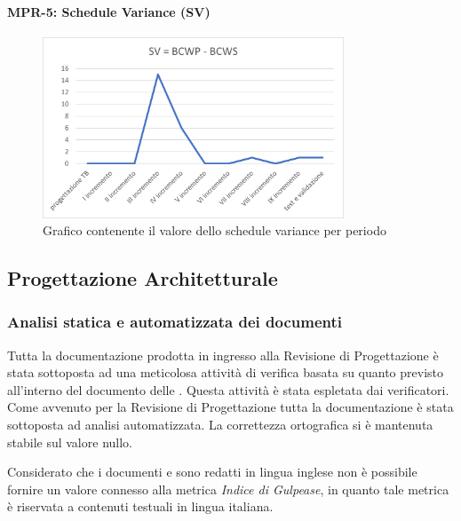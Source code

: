 \paragraph{MPR-5: Schedule Variance (SV)}\label{_SV}
\begin{figure}[!htb]
    \centering
    \includegraphics[width=0.8\textwidth]{res/images/metriche_costi/SV.png}
    \caption{Grafico contenente il valore dello schedule variance per periodo}
\end{figure} 

\newpage
\subsection{Progettazione Architetturale} 

\subsubsection{Analisi statica e automatizzata dei documenti}\label{resocontoProgettazioneArchitetturale}
Tutta la documentazione prodotta in ingresso alla Revisione di Progettazione è stata sottoposta ad una meticolosa attività di verifica
basata su quanto previsto all'interno del documento delle .
Questa attività è stata espletata dai verificatori.
Come avvenuto per la Revisione di Progettazione tutta la documentazione è stata sottoposta ad analisi automatizzata.
La correttezza ortografica si è mantenuta stabile sul valore nullo.

Considerato che i documenti  e   sono redatti in lingua inglese
non è possibile fornire un valore connesso alla metrica \textit{Indice di Gulpease}, in quanto tale metrica è riservata a contenuti 
testuali in lingua italiana.


